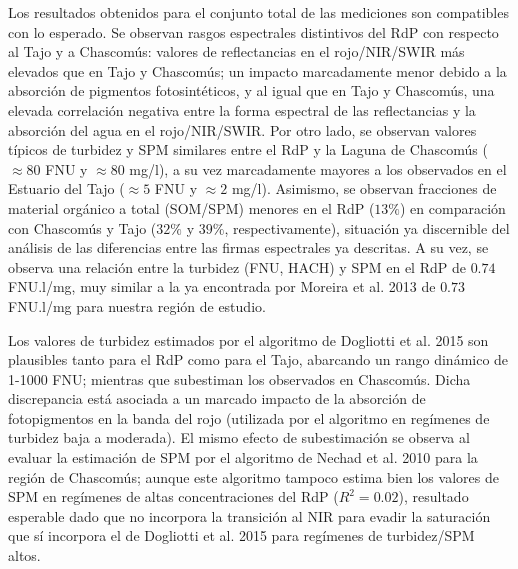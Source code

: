     Los resultados obtenidos para el conjunto total de las mediciones son compatibles con lo esperado. Se observan rasgos espectrales distintivos del RdP con respecto al Tajo y a Chascomús: valores de reflectancias en el rojo/NIR/SWIR más elevados que en Tajo y Chascomús; un impacto marcadamente menor debido a la absorción de pigmentos fotosintéticos, y al igual que en Tajo y Chascomús, una elevada correlación negativa entre la forma espectral de las reflectancias y la absorción del agua en el rojo/NIR/SWIR.
    Por otro lado, se observan valores típicos de turbidez y SPM similares entre el RdP y la Laguna de Chascomús ($\approx 80$ FNU y $\approx 80$ mg/l), a su vez marcadamente mayores a los observados en el Estuario del Tajo ($\approx 5$ FNU y $\approx 2$ mg/l). Asimismo, se observan fracciones de material orgánico a total (SOM/SPM) menores en el RdP ($13\%$) en comparación con Chascomús y Tajo ($32\%$ y $39\%$, respectivamente), situación ya discernible del análisis de las diferencias entre las firmas espectrales ya descritas. A su vez, se observa una relación entre la turbidez (FNU, HACH) y SPM en el RdP de $0.74$ FNU.l/mg, muy similar a la ya encontrada por Moreira et al. 2013 de $0.73$ FNU.l/mg para nuestra región de estudio.
    
    Los valores de turbidez estimados por el algoritmo de Dogliotti et al. 2015 son plausibles tanto para el RdP como para el Tajo, abarcando un rango dinámico de 1-1000 FNU; mientras que subestiman los observados en Chascomús. Dicha discrepancia está asociada a un marcado impacto de la absorción de fotopigmentos en la banda del rojo (utilizada por el algoritmo en regímenes de turbidez baja a moderada). El mismo efecto de subestimación se observa al evaluar la estimación de SPM por el algoritmo de Nechad et al. 2010 para la región de Chascomús; aunque este algoritmo tampoco estima bien los valores de SPM en regímenes de altas concentraciones del RdP ($R^{2}=0.02$), resultado esperable dado que no incorpora la transición al NIR para evadir la saturación que sí incorpora el de Dogliotti et al. 2015 para regímenes de turbidez/SPM altos.
    
